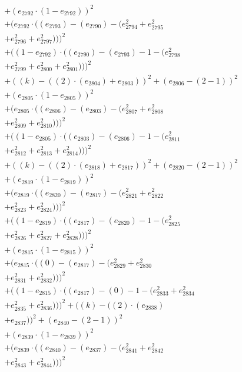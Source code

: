 \documentclass[10pt, a4paper]{article}
\begin{document}
\begin{small}
\begin{align*}
& + (e_{2792}  \cdot  (1 - e_{2792}))^{2} \\
& + (e_{2792}  \cdot  ((e_{2793}) - (e_{2790}) - (e_{2794}^{2} + e_{2795}^{2} \\
& + e_{2796}^{2} + e_{2797}^{2})))^{2} \\
& + ((1 - e_{2792})  \cdot  ((e_{2790}) - (e_{2793}) - 1 - (e_{2798}^{2} \\
& + e_{2799}^{2} + e_{2800}^{2} + e_{2801}^{2})))^{2} \\
& + ((k) - ((2)  \cdot  (e_{2804}) + e_{2803}))^{2} + (e_{2806} - (2 - 1))^{2} \\
& + (e_{2805}  \cdot  (1 - e_{2805}))^{2} \\
& + (e_{2805}  \cdot  ((e_{2806}) - (e_{2803}) - (e_{2807}^{2} + e_{2808}^{2} \\
& + e_{2809}^{2} + e_{2810}^{2})))^{2} \\
& + ((1 - e_{2805})  \cdot  ((e_{2803}) - (e_{2806}) - 1 - (e_{2811}^{2} \\
& + e_{2812}^{2} + e_{2813}^{2} + e_{2814}^{2})))^{2} \\
& + ((k) - ((2)  \cdot  (e_{2818}) + e_{2817}))^{2} + (e_{2820} - (2 - 1))^{2} \\
& + (e_{2819}  \cdot  (1 - e_{2819}))^{2} \\
& + (e_{2819}  \cdot  ((e_{2820}) - (e_{2817}) - (e_{2821}^{2} + e_{2822}^{2} \\
& + e_{2823}^{2} + e_{2824}^{2})))^{2} \\
& + ((1 - e_{2819})  \cdot  ((e_{2817}) - (e_{2820}) - 1 - (e_{2825}^{2} \\
& + e_{2826}^{2} + e_{2827}^{2} + e_{2828}^{2})))^{2} \\
& + (e_{2815}  \cdot  (1 - e_{2815}))^{2} \\
& + (e_{2815}  \cdot  ((0) - (e_{2817}) - (e_{2829}^{2} + e_{2830}^{2} \\
& + e_{2831}^{2} + e_{2832}^{2})))^{2} \\
& + ((1 - e_{2815})  \cdot  ((e_{2817}) - (0) - 1 - (e_{2833}^{2} + e_{2834}^{2} \\
& + e_{2835}^{2} + e_{2836}^{2})))^{2} + ((k) - ((2)  \cdot  (e_{2838}) \\
& + e_{2837}))^{2} + (e_{2840} - (2 - 1))^{2} \\
& + (e_{2839}  \cdot  (1 - e_{2839}))^{2} \\
& + (e_{2839}  \cdot  ((e_{2840}) - (e_{2837}) - (e_{2841}^{2} + e_{2842}^{2} \\
& + e_{2843}^{2} + e_{2844}^{2})))^{2} \\

\end{align*}
\end{small}
\end{document}
